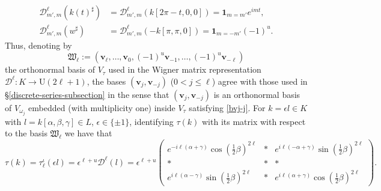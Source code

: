 \documentclass[11pt,oneside]{amsart}
\numberwithin{equation}{section}
\theoremstyle{remark}
\theoremstyle{plain}
\newcommand\UU{\mathrm{U}}
\newcommand{\bv}{\mathbf{v}}
\renewcommand\leq{\leqslant}
\begin{document}
\begin{align*}
\mathscr{D}^{\ell}_{m',m}(k(t)^{\sharp})&=\mathscr{D}^{\ell}_{m',m}(k[2\pi-t,0,0])=\mathbf{1}_{m=m'}e^{imt},\\
\mathscr{D}^{\ell}_{m',m}(w^{\sharp})&=\mathscr{D}^{\ell}_{m',m}(-k[\pi,\pi,0])=\mathbf{1}_{m=-m'}(-1)^u.
\end{align*}
Thus, denoting by
\[\mathfrak{W}_{\ell}:=(\bv_{\ell},\dotsc,\bv_0,(-1)^u\bv_{-1},\dotsc,(-1)^u\bv_{-\ell})\]
the orthonormal basis of $V_{\tau}$ used in the Wigner matrix representation $\mathscr{D}^{\ell}:K\to\UU(2\ell+1)$, the bases $(\bv_{j},\bv_{-j})$ ($0<j\leq\ell$) agree with those used in \S\ref{discrete-series-subsection} in the sense that $(\bv_{j},\bv_{-j})$ is an orthonormal 
basis of $V_{\omega_j}$ embedded (with multiplicity one) inside $V_{\tau}$ satisfying \eqref{bvj-j}. For $k=\epsilon l\in K$ with $l=k[\alpha,\beta,\gamma]\in L$, $\epsilon\in\{\pm 1\}$, identifying $\tau(k)$ with its matrix with respect to the basis $\mathfrak{W}_{\ell}$ we have that
\[ \tau(k)=\tau_{\ell}^{\iota}(\epsilon l) =\epsilon^{\ell+u}\mathscr{D}^{\ell}(l)=\epsilon^{\ell+u} \left(\begin{matrix}e^{-i\ell(\alpha + \gamma)} \cos(\frac{1}{2} \beta)^{2\ell} & * &e^{i\ell(-\alpha + \gamma)} \sin(\frac{1}{2} \beta)^{2\ell}\\ * & * & *\\ e^{i\ell(\alpha - \gamma)} \sin(\frac{1}{2} \beta)^{2\ell} & * &e^{i\ell(\alpha + \gamma)} \cos(\frac{1}{2} \beta)^{2\ell} \end{matrix}\right).\]
\end{document}
